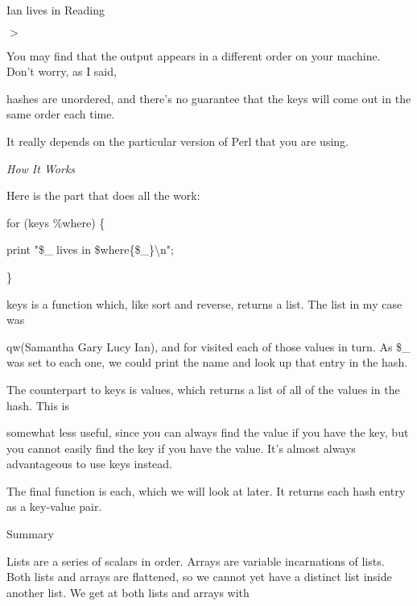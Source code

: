 \documentclass[a4paper,11pt]{book}
\begin{document}
\noindent Ian lives in Reading

\noindent $>$

\noindent 

\noindent You may find that the output appears in a different order on your machine. Don't worry, as I said,

\noindent hashes are unordered, and there's no guarantee that the keys will come out in the same order each time.

\noindent It really depends on the particular version of Perl that you are using.

\noindent 

\noindent \textit{How It Works}

\noindent Here is the part that does all the work:

\noindent 

\noindent 

\noindent for (keys \%where) \{

\noindent print "\$\_  lives in \$where\{\$\_\}\textbackslash n";

\noindent \}

\noindent 

\noindent keys is a function which, like sort and reverse, returns a list. The list in my case was

\noindent qw(Samantha Gary Lucy Ian),  and for visited each of those values in turn. As \$\_ was set to each one, we could print the name and look up that entry in the hash.

\noindent 

\noindent The counterpart to keys is values, which returns a list of all of the values in the hash. This is

\noindent somewhat less useful, since you can always find the value if you have the key, but you cannot easily find the key if you have the value. It's almost always advantageous to use keys instead.

\noindent 

\noindent The final function is each, which we will look at later. It returns each hash entry as a key-value pair.

\noindent 

\noindent 

\noindent 

\noindent 

\noindent Summary

\noindent 

\noindent Lists are a series of scalars in order. Arrays are variable incarnations of lists. Both lists and arrays are flattened, so we cannot yet have a distinct list inside another list. We get at both lists and arrays with
\end{document}

